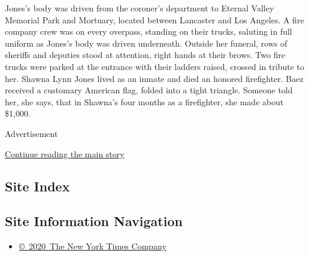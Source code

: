 Jones's body was driven from the coroner's department to Eternal Valley
Memorial Park and Mortuary, located between Lancaster and Los Angeles. A
fire company crew was on every overpass, standing on their trucks,
saluting in full uniform as Jones's body was driven underneath. Outside
her funeral, rows of sheriffs and deputies stood at attention, right
hands at their brows. Two fire trucks were parked at the entrance with
their ladders raised, crossed in tribute to her. Shawna Lynn Jones lived
as an inmate and died an honored firefighter. Baez received a customary
American flag, folded into a tight triangle. Someone told her, she says,
that in Shawna's four months as a firefighter, she made about \$1,000.

Advertisement

\protect\hyperlink{after-bottom}{Continue reading the main story}

\hypertarget{site-index}{%
\subsection{Site Index}\label{site-index}}

\hypertarget{site-information-navigation}{%
\subsection{Site Information
Navigation}\label{site-information-navigation}}

\begin{itemize}
\tightlist
\item
  \href{https://help.nytimes3xbfgragh.onion/hc/en-us/articles/115014792127-Copyright-notice}{©~2020~The
  New York Times Company}
\end{itemize}

